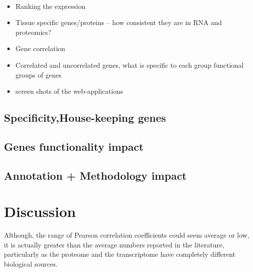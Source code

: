 


\clearpage\

\begin{itemize}
\item Ranking the expression
\item Tissue specific genes/proteins – how consistent they are in RNA and proteomics?
\item Gene correlation
\item Correlated and uncorrelated genes, what is specific to each group
    functional groups of genes
\item screen shots of the web-applications
\end{itemize}



\subsection{Specificity,House-keeping genes}
\subsection{Genes functionality impact}

\subsection{Annotation + Methodology impact}


\section{Discussion}

Although, the range of Pearson correlation coefficients could seem average or
low, it is actually greater than the average numbers reported in the literature,
particularly as the proteome and the transcriptome have completely different
biological sources.



